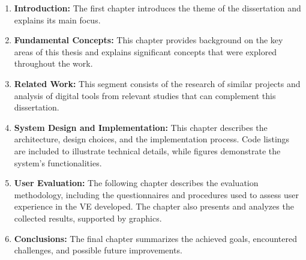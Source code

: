 \begin{enumerate}
\item \textbf{Introduction:} The first chapter introduces the theme of the dissertation and explains its main focus.

\item \textbf{Fundamental Concepts:} This chapter provides background on the key areas of this thesis and explains significant concepts that were explored throughout the work.

\item \textbf{Related Work:} This segment consists of the research of similar projects and analysis of digital tools from relevant studies that can complement this dissertation.

\item \textbf{System Design and Implementation:} This chapter describes the architecture, design choices, and the implementation process. Code listings are included to illustrate technical details, while figures demonstrate the system’s functionalities.

\item \textbf{User Evaluation:} The following chapter describes the evaluation methodology, including the questionnaires and procedures used to assess user experience in the \gls{VE} developed. The chapter also presents and analyzes the collected results, supported by graphics.

\item \textbf{Conclusions:} The final chapter summarizes the achieved goals,  encountered challenges, and possible future improvements. 
\end{enumerate}